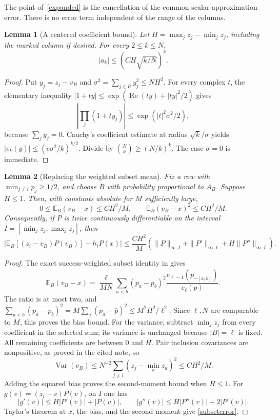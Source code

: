 \documentclass[11pt]{article}
\newtheorem{lemma}{Lemma}\newtheorem{theorem}{Theorem}
\newcommand{\E}{\mathbb E}\newcommand{\Pol}{\operatorname{Pol}}
\begin{document}
The point of~\eqref{expanded} is the cancellation of the common scalar
approximation error. There is no error term independent of the range
of the columns.

\begin{lemma}[A centered coefficient bound]\label{coefficient}
Let $H=\max_j z_j-\min_j z_j$, including the marked column if desired.
For every $2\le k\le N$,
\[
 |a_k|\le\left(C H\sqrt{k/N}\right)^k.
\]
\end{lemma}
\begin{proof}
Put $y_j=z_j-v_B$ and $\sigma^2=\sum_{j\in R}y_j^2\le NH^2$.
For every complex $t$, the elementary inequality
$|1+t y|\le\exp(\operatorname{Re}(ty)+|ty|^2/2)$ gives
\[
 \left|\prod_j(1+ty_j)\right|\le\exp(|t|^2\sigma^2/2),
\]
because $\sum_jy_j=0$. Cauchy's coefficient estimate at radius
$\sqrt{k}/\sigma$ yields
$|e_k(y)|\le(e\sigma^2/k)^{k/2}$.
Divide by $\binom Nk\ge(N/k)^k$. The case $\sigma=0$ is immediate.
\end{proof}

\begin{lemma}[Replacing the weighted subset mean]\label{subset}
Fix a row with $\min_{j\ne i}p_j\ge1/2$, and choose $B$ with
probability proportional to $A_B$. Suppose $H\le1$.
Then, with constants absolute for $M$ sufficiently large,
\[
 0\le\E_B(v_B-x)\le CH^2/M,\qquad
 \E_B(v_B-x)^2\le CH^2/M.
\]
Consequently, if $P$ is twice continuously differentiable on the
interval $I=[\min_jz_j,\max_jz_j]$, then
\begin{equation}\label{subseterror}
 \left|\E_B[(z_i-v_B)P(v_B)]-h_iP(x)\right|
 \le\frac{CH^2}{M}
       \left(\|P\|_{\infty,I}+\|P'\|_{\infty,I}
                                  +H\|P''\|_{\infty,I}\right).
\end{equation}
\end{lemma}
\begin{proof}
The exact success-weighted subset identity in
gives
\[
 \E_B(v_B-x)=\frac{\ell}{MN}
 \sum_{a<b}(p_a-p_b)^2
               \frac{e_{\ell-1}(p_{-[a,b]})}{e_\ell(p)}.
\]
The ratio is at most two, and
$\sum_{a<b}(p_a-p_b)^2
 =M\sum_a(p_a-\bar p)^2\le M^2H^2/\ell^2$.
Since $\ell,N$ are comparable to $M$, this proves the bias bound.
For the variance, subtract $\min_jz_j$ from every coefficient in the
selected sum; its variance is unchanged because $|B|=\ell$ is fixed.
All remaining coefficients are between $0$ and $H$. Pair inclusion
covariances are nonpositive, as proved in the cited note, so
\[
 \operatorname{Var}(v_B)\le N^{-2}\sum_{j\ne i}
                           (z_j-\min_a z_a)^2\le CH^2/M.
\]
Adding the squared bias proves the second-moment bound when $H\le1$.
For $g(v)=(z_i-v)P(v)$, on $I$ one has
\[
 |g'(v)|\le H|P'(v)|+|P(v)|,\qquad
 |g''(v)|\le H|P''(v)|+2|P'(v)|.
\]
Taylor's theorem at $x$, the bias, and the second moment give
\eqref{subseterror}.
\end{proof}
\end{document}
